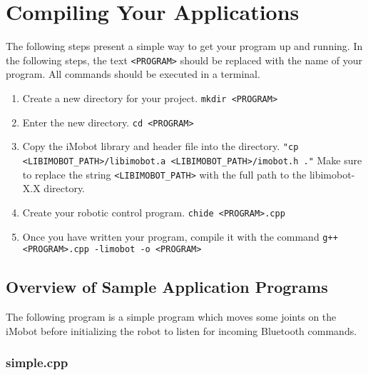 \documentclass[11pt]{report}
\begin{document}
\chapter{Compiling Your Applications}
The following steps present a simple way to get your program up and running. In
the following steps, the text \texttt{<PROGRAM>} should be replaced with the
name of your program. All commands should be executed in a terminal.
\begin{enumerate}
\item Create a new directory for your project. \texttt{mkdir <PROGRAM>}
\item Enter the new directory. \texttt{cd <PROGRAM>}
\item Copy the iMobot library and header file into the directory. \texttt{"cp
<LIBIMOBOT\_PATH>/libimobot.a <LIBIMOBOT\_PATH>/imobot.h ."} Make sure to
replace the string \texttt{<LIBIMOBOT\_PATH>} with the full path to the
libimobot-X.X directory.
\item Create your robotic control program. \texttt{chide <PROGRAM>.cpp}
\item Once you have written your program, compile it with the command \texttt{g++ <PROGRAM>.cpp -limobot -o <PROGRAM>} 
\end{enumerate}


\section{Overview of Sample Application Programs}
The following program is a simple program which moves some joints on the iMobot
before initializing the robot to listen for incoming Bluetooth commands.
\subsection{simple.cpp \label{subsec:simple.cpp}}
\end{document}
